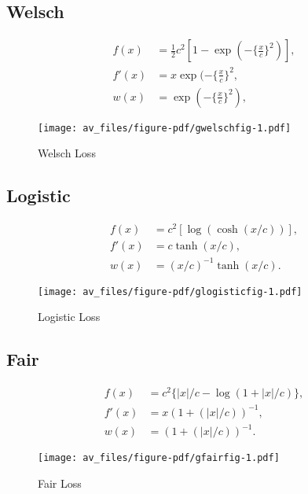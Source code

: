 \documentclass[
  12pt,
  letterpaper,
  DIV=11,
  numbers=noendperiod]{scrartcl}
\theoremstyle{plain}
\theoremstyle{plain}
\theoremstyle{plain}
\theoremstyle{definition}
\theoremstyle{remark}
\begin{document}
\subsection{Welsch}\label{welsch}

\begin{align}
f(x)&=\frac12c^2[1-\exp(-\{\frac{x}{c}\}^2)],\\
f'(x)&=x\exp(-\{\frac{x}{c}\}^2,\\
w(x)&=\exp(-\{\frac{x}{c}\}^2),
\end{align}

\begin{figure}[H]

{\centering \texttt{[image: av\_files/figure-pdf/gwelschfig-1.pdf]}

}

\caption{Welsch Loss}

\end{figure}%

\subsection{Logistic}\label{logistic}

\begin{align}
f(x)&=c^2[\log(\cosh(x/c))],\\
f'(x)&=c\tanh(x/c),\\
w(x)&=(x/c)^{-1}\tanh(x/c).
\end{align}

\begin{figure}[H]

{\centering \texttt{[image: av\_files/figure-pdf/glogisticfig-1.pdf]}

}

\caption{Logistic Loss}

\end{figure}%

\subsection{Fair}\label{fair}

\begin{align}
f(x)&=c^2\{|x|/c-\log(1+|x|/c)\},\\
f'(x)&=x(1+(|x|/c))^{-1},\\
w(x)&=(1+(|x|/c))^{-1}.
\end{align}

\begin{figure}[H]

{\centering \texttt{[image: av\_files/figure-pdf/gfairfig-1.pdf]}

}

\caption{Fair Loss}

\end{figure}%
\end{document}
